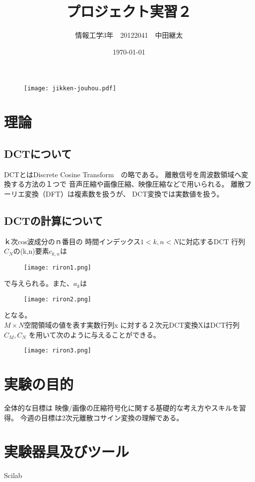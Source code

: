 \documentclass[a4j]{jsarticle}
\title{プロジェクト実習２}
\author{情報工学3年　20122041　中田継太}
\date{\today}
\begin{document}
\thispagestyle{empty}

\begin{figure}
  \center
  \texttt{[image: jikken-jouhou.pdf]}
\end{figure}

\clearpage
\setcounter{tocdepth}{2}
\tableofcontents
\clearpage
\twocolumn

\section{理論\cite{cite:riron1}}
\subsection{DCTについて}
DCTとはDiscrete Cosine Transform　の略である。
離散信号を周波数領域へ変換する方法の１つで
音声圧縮や画像圧縮、映像圧縮などで用いられる。
離散フーリエ変換（DFT）は複素数を扱うが、
DCT変換では実数値を扱う。
\subsection{DCTの計算について}
ｋ次cos波成分のｎ番目の
時間インデックス$1<k,n<N$に対応するDCT
行列$C_{N}$の(k,n)要素$c_{k,n}$は
\begin{figure}[H]
  \centering
  \texttt{[image: riron1.png]}
\end{figure}
で与えられる。また、$a_k$は
\begin{figure}[H]
  \centering
  \texttt{[image: riron2.png]}
\end{figure}
となる。\\
$M\times N$空間領域の値を表す実数行列x
に対する２次元DCT変換XはDCT行列$C_M,C_N$
を用いて次のように与えることができる。
\begin{figure}[H]
  \centering
  \texttt{[image: riron3.png]}
\end{figure}


\section{実験の目的\cite{cite:object}}
全体的な目標は
映像/画像の圧縮符号化に関する基礎的な考え方やスキルを習得。
今週の目標は2次元離散コサイン変換の理解である。

\section{実験器具及びツール}
Scilab
\end{document}
